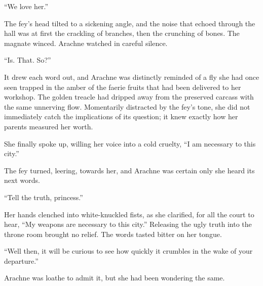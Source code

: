 “We love her.”

The fey’s head tilted to a sickening angle, and the noise that echoed through the hall was at first the crackling of branches, then the crunching of bones. The magnate winced. Arachne watched in careful silence. 

“Is. That. So?” 

It drew each word out, and Arachne was distinctly reminded of a fly she had once seen trapped in the amber of the faerie fruits that had been delivered to her workshop. The golden treacle had dripped away from the preserved carcass with the same unnerving flow. Momentarily distracted by the fey’s tone, she did not immediately catch the implications of its question; it knew exactly how her parents measured her worth.

She finally spoke up, willing her voice into a cold cruelty, “I am necessary to this city.”

The fey turned, leering, towards her, and Arachne was certain only she heard its next words.

“Tell the truth, princess.”

Her hands clenched into white-knuckled fists, as she clarified, for all the court to hear, “My weapons are necessary to this city.” Releasing the ugly truth into the throne room brought no relief. The words tasted bitter on her tongue. 

“Well then, it will be curious to see how quickly it crumbles in the wake of your departure.” 

Arachne was loathe to admit it, but she had been wondering the same. 
